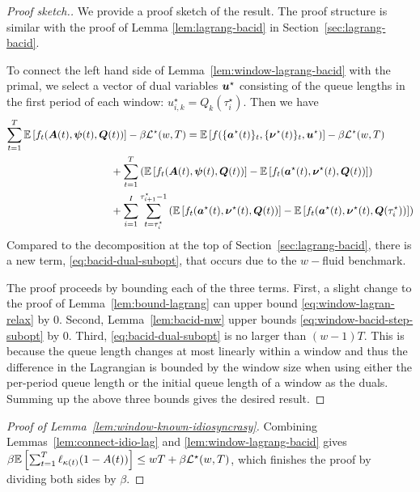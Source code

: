 \begin{proof}[Proof sketch.]
We provide a proof sketch of the result. The proof structure is similar with the proof of Lemma \ref{lem:lagrang-bacid} in Section~\ref{sec:lagrang-bacid}.

To connect the left hand side of Lemma~\ref{lem:window-lagrang-bacid} with the primal, we select a vector of dual variables $\boldsymbol{u}^\star$ consisting of the queue lengths in the first period of each window: $u^\star_{i,k} = Q_k(\tau^\star_i)$. Then we have
\begin{align}
\sum_{t=1}^T \expect{f_t(\bolds{A}(t), \bolds{\psi}(t), \bolds{Q}(t))} - \beta \loss^\star(w,T) &= \expect{f(\{\bolds{a}^\star(t)\}_t,\{\bolds{\nu}^\star(t)\}_t,\bolds{u}^\star)} - \beta \loss^\star(w,T) \label{eq:window-lagran-relax}\\
&\hspace{-1in}+\sum_{t=1}^T\left(\expect{f_t(\bolds{A}(t), \bolds{\psi}(t), \bolds{Q}(t))} -\expect{f_t(\bolds{a}^\star(t), \bolds{\nu}^\star(t), \bolds{Q}(t))}\right) \label{eq:window-bacid-step-subopt} \\
&\hspace{-1in}+\sum_{i=1}^I\sum_{t=\tau_i^\star}^{\tau_{i+1}^\star-1}\left(\expect{f_t(\bolds{a}^\star(t), \bolds{\nu}^\star(t), \bolds{Q}(t))} - \expect{f_t(\bolds{a}^\star(t), \bolds{\nu}^\star(t), \bolds{Q}(\tau^\star_{i}))}\right)\label{eq:bacid-dual-subopt}
\end{align}
Compared to the decomposition at the top of Section~\ref{sec:lagrang-bacid}, there is a new term, \eqref{eq:bacid-dual-subopt}, that occurs due to the $w-$fluid benchmark.

The proof proceeds by bounding each of the three terms. First, a slight change to the proof of Lemma~\ref{lem:bound-lagrang} can  upper bound \eqref{eq:window-lagran-relax} by $0.$ Second, Lemma~\ref{lem:bacid-mw} upper bounds \eqref{eq:window-bacid-step-subopt} by $0$. Third, \eqref{eq:bacid-dual-subopt} is no larger than $(w-1)T$.
This is because the queue length  changes  at most linearly within a window and thus the difference in the Lagrangian is bounded by the window size when using either the per-period queue length or the initial queue length of a window as the duals. Summing up the above three bounds gives the desired result.
\end{proof}
\begin{proof}[Proof of Lemma~\ref{lem:window-known-idiosyncrasy}]
Combining Lemmas~\ref{lem:connect-idio-lag} and \ref{lem:window-lagrang-bacid} gives $\beta \mathbb E\left[\sum_{t=1}^{T}\ell_{\kappa(t)}(1-A(t))\right] \leq wT + \beta \mathcal{L}^\star(w,T)$, which finishes the proof by dividing both sides by $\beta$.
\end{proof}